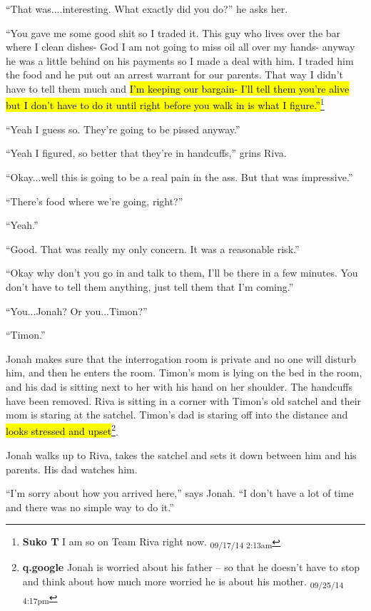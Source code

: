 ``That was....interesting.  What exactly did you do?'' he asks her.

``You gave me some good shit so I traded it.  This guy who lives over the bar where I clean dishes- God I am not going to miss oil all over my hands- anyway he was a little behind on his payments so I made a deal with him.  I traded him the food and he put out an arrest warrant for our parents.  That way I didn't have to tell them much and \hl{I'm keeping our bargain- I'll tell them you're alive but I don't have to do it until right before you walk in is what I figure.''}\footnote{\textbf{Suko T }I am so on Team Riva right now. \textsubscript{09/17/14 2:13am}}

``Yeah I guess so.  They're going to be pissed anyway.''

``Yeah I figured, so better that they're in handcuffs,'' grins Riva.

``Okay...well this is going to be a real pain in the ass.  But that was impressive.''

``There's food where we're going, right?''

``Yeah.''

``Good.  That was really my only concern.  It was a reasonable risk.''

``Okay why don't you go in and talk to them, I'll be there in a few minutes.  You don't have to tell them anything, just tell them that I'm coming.''

``You...Jonah?  Or you...Timon?''

``Timon.''



Jonah makes sure that the interrogation room is private and no one will disturb him, and then he enters the room.  Timon's mom is lying on the bed in the room, and his dad is sitting next to her with his hand on her shoulder.  The handcuffs have been removed.  Riva is sitting in a corner with Timon's old satchel and their mom is staring at the satchel.  Timon's dad is staring off into the distance and \hl{looks stressed and upset}\footnote{\textbf{q.google }Jonah is worried about his father -- so that he doesn't have to stop and think about how much more worried he is about his mother. \textsubscript{09/25/14 4:17pm}}.



Jonah walks up to Riva, takes the satchel and sets it down between him and his parents.  His dad watches him. 

``I'm sorry about how you arrived here,'' says Jonah.  ``I don't have a lot of time and there was no simple way to do it.''

